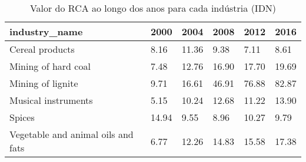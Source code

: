 \begin{table}
\centering
\caption{Valor do RCA ao longo dos anos para cada indústria (IDN)}
\begin{tabular}{p{6cm}p{1.5cm}p{1.5cm}p{1.5cm}p{1.5cm}p{1.5cm}}
\toprule
                     industry\_name &  2000 &  2004 &  2008 &  2012 &  2016 \\
\midrule
                   Cereal products &  8.16 & 11.36 &  9.38 &  7.11 &  8.61 \\
               Mining of hard coal &  7.48 & 12.76 & 16.90 & 17.70 & 19.69 \\
                 Mining of lignite &  9.71 & 16.61 & 46.91 & 76.88 & 82.87 \\
               Musical instruments &  5.15 & 10.24 & 12.68 & 11.22 & 13.90 \\
                            Spices & 14.94 &  9.55 &  8.96 & 10.27 &  9.79 \\
Vegetable and animal oils and fats &  6.77 & 12.26 & 14.83 & 15.58 & 17.38 \\
\bottomrule
\end{tabular}
\end{table}
